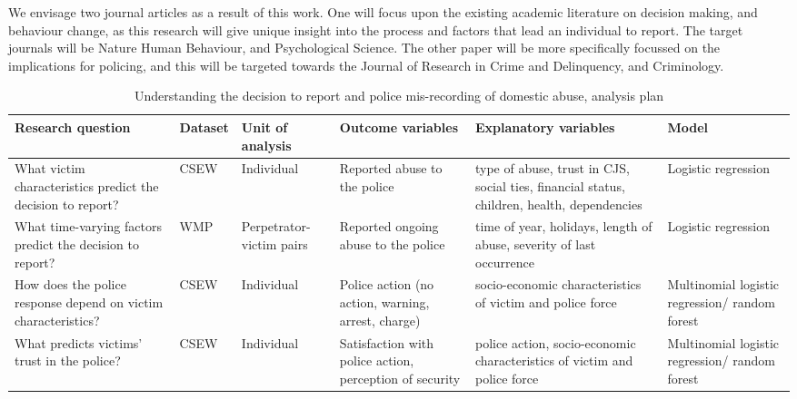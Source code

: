 \documentclass[11pt, a4paper]{article}
\newcommand{\AT}[1] {{\textcolor{blue}{#1}}}
\begin{document}
We envisage two journal articles as a result of this work. One will focus upon the existing academic literature on decision making, and behaviour change, as this research will give unique insight into the process and factors that lead an individual to report. The target journals will be Nature Human Behaviour, and Psychological Science. The other paper will be more specifically focussed on the implications for policing, and this will be targeted towards the Journal of Research in Crime and Delinquency, and Criminology.




\begin{table}[!htbp]
\caption{Understanding the decision to report and police mis-recording of domestic abuse, analysis plan}
  \begin{threeparttable}[t]
  \centering
       \begin{tabular}{ L{3cm}  C{1.1cm}  C{1.5cm}  C{3cm}  C{3.3cm}  C{2.8cm} }
    \toprule
     \textbf{Research question} & \textbf{Dataset}    & \textbf{Unit of analysis} & \textbf{Outcome variables} & \textbf{Explanatory variables} & \textbf{Model} \\
                \midrule
     What victim characteristics predict the decision to report? & CSEW & Individual  & Reported abuse to the police & type of abuse, trust in CJS, social ties, financial status, children, health, dependencies & Logistic regression \\
       \midrule
          What time-varying factors predict the decision to report? & WMP & Perpetrator-victim pairs & Reported ongoing abuse to the police & time of year, holidays, length of abuse, severity of last occurrence & Logistic regression \\                    
                     \midrule
    How does the police response depend on victim characteristics? & CSEW  & Individual & Police action (no action, warning, arrest, charge) &  socio-economic characteristics of victim and police force  & Multinomial logistic regression/ random forest \\
     \midrule
    What predicts victims' trust in the police? & CSEW  & Individual & Satisfaction with police action, perception of security & police action,  socio-economic characteristics of victim and police force & Multinomial logistic regression/ random forest \\
     \bottomrule
  \end{tabular}
    \end{threeparttable}%
  \label{tab:addlabel}%
\end{table}%
\end{document}
